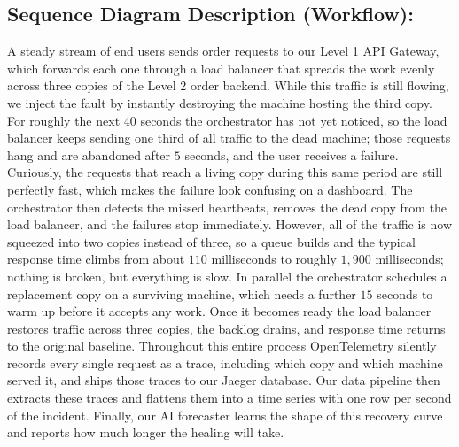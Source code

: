 \subsection{Sequence Diagram Description (Workflow):}
A steady stream of end users sends order requests to our Level 1 API Gateway,
which forwards each one through a load balancer that spreads the work evenly
across three copies of the Level 2 order backend. While this traffic is still
flowing, we inject the fault by instantly destroying the machine hosting the
third copy. For roughly the next $40$ seconds the orchestrator has not yet
noticed, so the load balancer keeps sending one third of all traffic to the dead
machine; those requests hang and are abandoned after $5$ seconds, and the user
receives a failure. Curiously, the requests that reach a living copy during this
same period are still perfectly fast, which makes the failure look confusing on
a dashboard. The orchestrator then detects the missed heartbeats, removes the
dead copy from the load balancer, and the failures stop immediately. However,
all of the traffic is now squeezed into two copies instead of three, so a queue
builds and the typical response time climbs from about $110$ milliseconds to
roughly $1{,}900$ milliseconds; nothing is broken, but everything is slow. In
parallel the orchestrator schedules a replacement copy on a surviving machine,
which needs a further $15$ seconds to warm up before it accepts any work. Once
it becomes ready the load balancer restores traffic across three copies, the
backlog drains, and response time returns to the original baseline. Throughout
this entire process OpenTelemetry silently records every single request as a
trace, including which copy and which machine served it, and ships those traces
to our Jaeger database. Our data pipeline then extracts these traces and
flattens them into a time series with one row per second of the incident.
Finally, our AI forecaster learns the shape of this recovery curve and reports
how much longer the healing will take.

